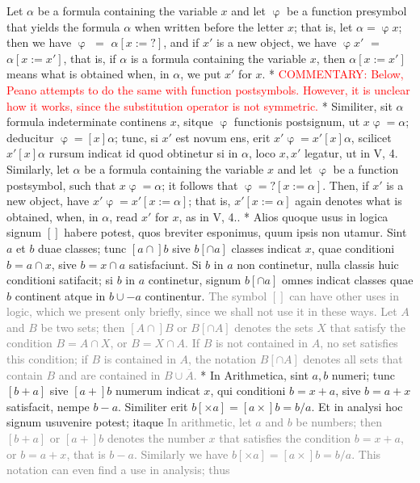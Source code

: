 \documentclass{book}
\newcommand\irrelavent[1]{\textcolor{gray}{#1}}
\newcommand\commentary[1]{\textcolor{red}{COMMENTARY: #1}}
\newenvironment{translateTwoCol}
               { %
                 \columnratio{0.5, 0.5} \begin{paracol}{2}
                 \newcommand{\LAT}{\switchcolumn[0]*}
                 \newcommand{\ENG}{\switchcolumn[1]}
               }
               { %
                 \let\ENG\undefined
                 \let\LAT\undefined
                 \end{paracol}
               }
\begin{document}
\begin{translateTwoCol}
\ENG
Let $\alpha$ be a formula containing the variable $x$ and let $\upvarphi$ be a function presymbol that yields the formula $\alpha$ when written before the letter $x$; that is, let $\alpha = \upvarphi x$; then we have $\upvarphi$ $=$ $\alpha [x := ? ]$, and if $x'$ is a new object, we have $\upvarphi x'$ $=$ $\alpha [x := x']$, that is, if $\alpha$ is a formula containing the variable $x$, then $\alpha[x := x']$ means what is obtained when, in $\alpha$, we put $x'$ for $x$.
\LAT
\ENG
\commentary{Below, Peano attempts to do the same with function postsymbols.  However, it is unclear how it works, since the substitution operator is not symmetric.}
\LAT
Similiter, sit $\alpha$ formula indeterminate continens $x$, sitque $\upvarphi$ functionis postsignum, ut $x \upvarphi = \alpha$; deducitur $\upvarphi = [x] \alpha$; tunc, si $x'$ est novum ens, erit $x' \upvarphi = x' [x] \alpha$, scilicet $x' [x] \alpha$ rursum indicat id quod obtinetur si in $\alpha$, loco $x, x'$ legatur, ut in V, 4.
\ENG
Similarly, let $\alpha$ be a formula containing the variable $x$ and let $\upvarphi$ be a function postsymbol, such that $x\upvarphi = \alpha$; it follows that $\upvarphi = ?[x := \alpha]$. Then, if $x'$ is a new object, have $x' \upvarphi = x'[x := \alpha]$; that is, $x'[x := \alpha]$ again denotes what is obtained, when, in $\alpha$, read $x'$ for $x$, as in V, 4..
\LAT
Alios quoque usus in logica signum $[ ]$ habere potest, quos breviter esponimus, quum ipsis non utamur. Sint $a$ et $b$ duae classes; tunc $[a \cap ]b$ sive $b[ \cap a]$ classes indicat $x$, quae conditioni $b = a \cap x$, sive $b = x \cap a$ satisfaciunt. Si $b$ in $a$ non continetur, nulla classis huic conditioni satifacit; si $b$ in $a$ continetur, signum $b [ \cap a ]$ omnes indicat classes quae $b$ continent atque in $b \cup - a$ continentur.
\ENG
\irrelavent{The symbol $[ ]$ can have other uses in logic, which we present only briefly, since we shall not use it in these ways. Let $A$ and $B$ be two sets; then $[A \cap ]B$ or $B[ \cap A]$ denotes the sets $X$ that satisfy the condition $B = A \cap X$, or $B = X \cap A$. If $B$ is not contained in $A$, no set satisfies this condition; if $B$ is contained in $A$, the notation $B [ \cap A ]$ denotes all sets that contain $B$ and are contained in $B \cup  \overline{A}$.} %
\LAT
In Arithmetica, sint $a, b$ numeri; tunc $[b + a]$ sive $[a +] b$ numerum indicat $x$, qui conditioni $b = x + a$, sive $b = a + x$ satisfacit, nempe $b - a$. Similiter erit $b [ \times a ] = [a \times ] b = b / a$. Et in analysi hoc signum usuvenire potest; itaque
\ENG
\irrelavent{In arithmetic, let $a$ and $b$ be numbers; then $[b + a]$ or $[a +] b$ denotes the number $x$ that satisfies the condition $b = x + a$, or $b = a + x$, that is $b - a$. Similarly we have $b [ \times a ] = [a \times ] b = b / a$. This notation can even find a use in analysis; thus} %
\end{translateTwoCol}
\end{document}
